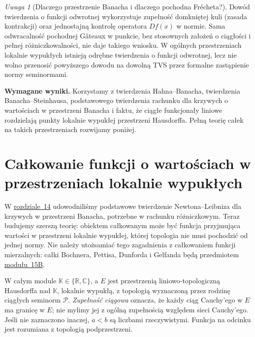 \documentclass[11pt,a4paper]{article}
\numberwithin{equation}{section}
\theoremstyle{plain}
\theoremstyle{definition}
\theoremstyle{remark}
\newtheorem{uwaga}[twierdzenie]{Uwaga}
\newcommand{\R}{\mathbb R}
\newcommand{\C}{\mathbb C}
\newcommand{\K}{\mathbb K}
\begin{document}
\begin{uwaga}[Dlaczego przestrzenie Banacha i dlaczego pochodna Frécheta?]
\label{rem:limits-inverse15}
Dowód twierdzenia o funkcji odwrotnej wykorzystuje zupełność domkniętej kuli (zasada kontrakcji) oraz jednostajną kontrolę operatora $Df(x)$ w normie. Sama odwracalność pochodnej Gâteaux w punkcie, bez stosownych założeń o ciągłości i pełnej różniczkowalności, nie daje takiego wniosku. W ogólnych przestrzeniach lokalnie wypukłych istnieją odrębne twierdzenia o funkcji odwrotnej, lecz nie wolno przenosić powyższego dowodu na dowolną TVS przez formalne zastąpienie normy seminormami.
\end{uwaga}


\setcounter{section}{15}
\noindent\textbf{Wymagane wyniki.} Korzystamy z twierdzenia Hahna--Banacha, twierdzenia Banacha--Steinhausa, podstawowego twierdzenia rachunku dla krzywych o wartościach w przestrzeni Banacha i faktu, że ciągłe funkcjonały liniowe rozdzielają punkty lokalnie wypukłej przestrzeni Hausdorffa. Pełną teorię całek na takich przestrzeniach rozwijamy poniżej.
\medskip
\begingroup
\renewcommand{\thesection}{15A}
\renewcommand{\theHsection}{15A}
\section{Całkowanie funkcji o wartościach w przestrzeniach lokalnie wypukłych}
\label{sec:integral-lcs15a}

W \hyperref[sec:gateaux-frechet14]{rozdziale~14} udowodniliśmy podstawowe twierdzenie
Newtona--Leibniza dla krzywych w przestrzeni Banacha, potrzebne w rachunku
różniczkowym. Teraz budujemy szerszą teorię: obiektem całkowanym może być
funkcja przyjmująca wartości w przestrzeni lokalnie wypukłej, której topologia
nie musi pochodzić od jednej normy. Nie należy utożsamiać tego zagadnienia
z całkowaniem funkcji mierzalnych: całki Bochnera, Pettisa, Dunforda i Gelfanda
będą przedmiotem \hyperref[sec:integral-vector15b]{modułu~15B}.

W całym module $\K\in\{\R,\C\}$, a $E$ jest przestrzenią liniowo-topologiczną
Hausdorffa nad $\K$, lokalnie wypukłą, z topologią wyznaczoną przez rodzinę
ciągłych seminorm $\mathcal P$. \emph{Zupełność ciągowa} oznacza, że każdy
ciąg Cauchy'ego w $E$ ma granicę w $E$; nie mylimy jej z ogólną zupełnością
względem sieci Cauchy'ego. Jeśli nie zaznaczono inaczej, $a<b$ są liczbami
rzeczywistymi. Funkcja na odcinku jest rozumiana z topologią podprzestrzeni.
\end{document}
